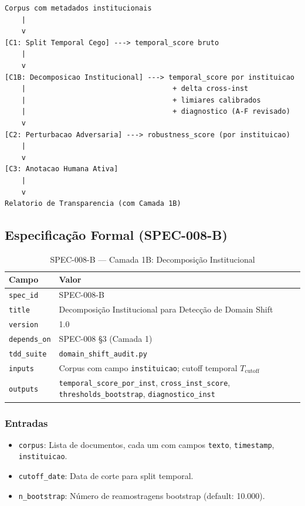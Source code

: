 \documentclass[12pt,a4paper]{article}
\theoremstyle{remark}
\begin{document}
\begin{verbatim}
Corpus com metadados institucionais
    |
    v
[C1: Split Temporal Cego] ---> temporal_score bruto
    |
    v
[C1B: Decomposicao Institucional] ---> temporal_score por instituicao
    |                                   + delta cross-inst
    |                                   + limiares calibrados
    |                                   + diagnostico (A-F revisado)
    v
[C2: Perturbacao Adversaria] ---> robustness_score (por instituicao)
    |
    v
[C3: Anotacao Humana Ativa]
    |
    v
Relatorio de Transparencia (com Camada 1B)
\end{verbatim}

\subsection{Especificação Formal (SPEC-008-B)}

\begin{table}[H]\centering\footnotesize
\caption{SPEC-008-B — Camada 1B: Decomposição Institucional}
\label{tab:spec_008b}
\begin{tabular}{p{}p{}}
\toprule
\textbf{Campo} & \textbf{Valor} \\
\midrule
\texttt{spec\_id} & SPEC-008-B \\
\texttt{title} & Decomposição Institucional para Detecção de Domain Shift \\
\texttt{version} & 1.0 \\
\texttt{depends\_on} & SPEC-008 §3 (Camada 1) \\
\texttt{tdd\_suite} & \texttt{domain\_shift\_audit.py} \\
\texttt{inputs} & Corpus com campo \texttt{instituicao}; cutoff temporal $T_{\text{cutoff}}$ \\
\texttt{outputs} & \texttt{temporal\_score\_por\_inst}, \texttt{cross\_inst\_score}, \texttt{thresholds\_bootstrap}, \texttt{diagnostico\_inst} \\
\bottomrule
\end{tabular}
\end{table}

\subsubsection{Entradas}

\begin{itemize}[nosep]
  \item \texttt{corpus}: Lista de documentos, cada um com campos \texttt{texto}, \texttt{timestamp}, \texttt{instituicao}.
  \item \texttt{cutoff\_date}: Data de corte para split temporal.
  \item \texttt{n\_bootstrap}: Número de reamostragens bootstrap (default: 10.000).
\end{itemize}
\end{document}
